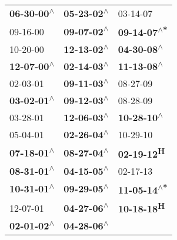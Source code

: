 \begin{supertabular}{lll}
 \textbf{06-30-00\textsuperscript{$\wedge$}} &  \textbf{05-23-02\textsuperscript{$\wedge$}} &                    03-14-07\textsuperscript{} \\
                  09-16-00\textsuperscript{} &  \textbf{09-07-02\textsuperscript{$\wedge$}} &  \textbf{09-14-07\textsuperscript{$\wedge$*}} \\
                  10-20-00\textsuperscript{} &  \textbf{12-13-02\textsuperscript{$\wedge$}} &   \textbf{04-30-08\textsuperscript{$\wedge$}} \\
 \textbf{12-07-00\textsuperscript{$\wedge$}} &  \textbf{02-14-03\textsuperscript{$\wedge$}} &   \textbf{11-13-08\textsuperscript{$\wedge$}} \\
                  02-03-01\textsuperscript{} &  \textbf{09-11-03\textsuperscript{$\wedge$}} &                    08-27-09\textsuperscript{} \\
 \textbf{03-02-01\textsuperscript{$\wedge$}} &  \textbf{09-12-03\textsuperscript{$\wedge$}} &                    08-28-09\textsuperscript{} \\
                  03-28-01\textsuperscript{} &  \textbf{12-06-03\textsuperscript{$\wedge$}} &   \textbf{10-28-10\textsuperscript{$\wedge$}} \\
                  05-04-01\textsuperscript{} &  \textbf{02-26-04\textsuperscript{$\wedge$}} &                    10-29-10\textsuperscript{} \\
 \textbf{07-18-01\textsuperscript{$\wedge$}} &  \textbf{08-27-04\textsuperscript{$\wedge$}} &          \textbf{02-19-12\textsuperscript{H}} \\
 \textbf{08-31-01\textsuperscript{$\wedge$}} &  \textbf{04-15-05\textsuperscript{$\wedge$}} &                    02-17-13\textsuperscript{} \\
 \textbf{10-31-01\textsuperscript{$\wedge$}} &  \textbf{09-29-05\textsuperscript{$\wedge$}} &  \textbf{11-05-14\textsuperscript{$\wedge$*}} \\
                  12-07-01\textsuperscript{} &  \textbf{04-27-06\textsuperscript{$\wedge$}} &          \textbf{10-18-18\textsuperscript{H}} \\
 \textbf{02-01-02\textsuperscript{$\wedge$}} &  \textbf{04-28-06\textsuperscript{$\wedge$}} &                                               \\
\end{supertabular}
